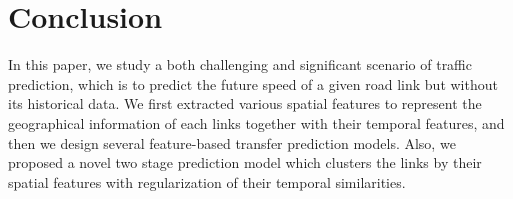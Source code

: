 \section{Conclusion}
In this paper,
we study a both challenging and significant scenario of traffic prediction, which is to predict the future speed of a given road link but without its historical data. 
We first extracted various spatial features to represent the geographical information of each links together with their temporal features,
and then we design several feature-based transfer prediction models.
Also, we proposed a novel two stage prediction model which clusters the links by their spatial features with regularization of their temporal similarities.


